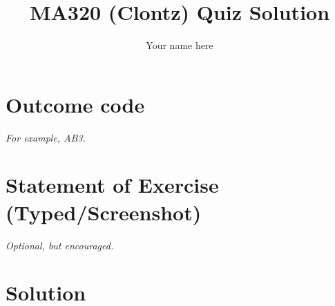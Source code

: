 \documentclass{article}
\title{MA320 (Clontz) Quiz Solution}
\author{Your name here}
\begin{document}
\maketitle

\section{Outcome code}
\textit{For example, AB3.}





\section{Statement of Exercise (Typed/Screenshot)}
\textit{Optional, but encouraged.}





\section{Solution}
\end{document}
